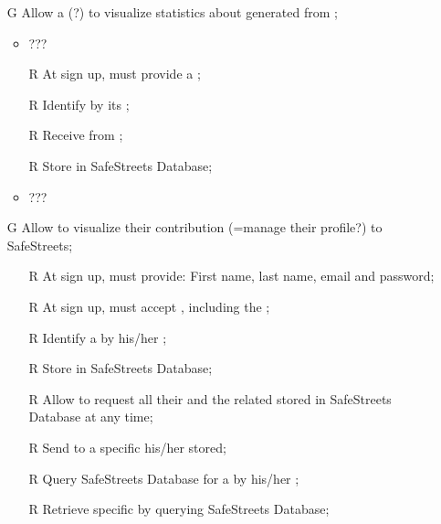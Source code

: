 \documentclass[../../../rasd.tex]{subfiles}
\begin{document}
\begin{itemize}
	\item[G\subs{7}]Allow a  (?) to visualize statistics about  generated from ;
	\begin{itemize}
		\item ???
		\item[R\subs{31}]At sign up,  must provide a ;
		\item[R\subs{32}]Identify  by its ;
		\item[R\subs{33}]Receive  from ;
		\item[R\subs{34}]Store  in SafeStreets Database;
		\item ???
	\end{itemize}

	\item[G\subs{8}]Allow  to visualize their contribution (=manage their profile?) to SafeStreets;
	\begin{itemize}
		\item[R\subs{1}]At sign up,  must provide: First name, last name, email and password;
		\item[R\subs{2}]At sign up,  must accept , including the ;
		\item[R\subs{3}]Identify a  by his/her ;
		\item[R\subs{10}]Store  in SafeStreets Database;
		\item[R\subs{12a}]Allow  to request all their  and the related  stored in SafeStreets Database at any time;
		\item[R\subs{12b}]Send to a specific  his/her  stored;
		\item[R\subs{13}]Query SafeStreets Database for a  by his/her ;
		\item[R\subs{14}]Retrieve specific  by querying SafeStreets Database;
	\end{itemize}

\end{itemize}
\end{document}
